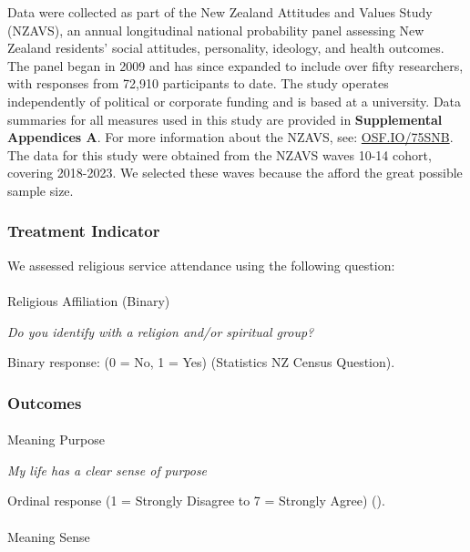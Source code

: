 \documentclass[
  single column]{article}
\makeatletter
\let\oldparagraph\paragraph
\renewcommand{\paragraph}{
    \@ifstar
      \xxxParagraphStar
      \xxxParagraphNoStar
  }
\newcommand{\xxxParagraphStar}[1]{\oldparagraph*{#1}\mbox{}}
\newcommand{\xxxParagraphNoStar}[1]{\oldparagraph{#1}\mbox{}}
\makeatother
\begin{document}
Data were collected as part of the New Zealand Attitudes and Values
Study (NZAVS), an annual longitudinal national probability panel
assessing New Zealand residents' social attitudes, personality,
ideology, and health outcomes. The panel began in 2009 and has since
expanded to include over fifty researchers, with responses from 72,910
participants to date. The study operates independently of political or
corporate funding and is based at a university. Data summaries for all
measures used in this study are provided in \textbf{Supplemental
Appendices A}. For more information about the NZAVS, see:
\href{https://doi.org/10.17605/OSF.IO/75SNB}{OSF.IO/75SNB}. The data for
this study were obtained from the NZAVS waves 10-14 cohort, covering
2018-2023. We selected these waves because the afford the great possible
sample size.

\subsubsection{Treatment Indicator}\label{treatment-indicator}

We assessed religious service attendance using the following question:

\paragraph{Religious Affiliation
(Binary)}\label{religious-affiliation-binary}

\emph{Do you identify with a religion and/or spiritual group?}

Binary response: (0 = No, 1 = Yes) (Statistics NZ Census Question).

\subsubsection{Outcomes}\label{outcomes}

\paragraph{Meaning Purpose}\label{meaning-purpose}

\emph{My life has a clear sense of purpose}

Ordinal response (1 = Strongly Disagree to 7 = Strongly Agree)
().

\paragraph{Meaning Sense}\label{meaning-sense}
\end{document}
